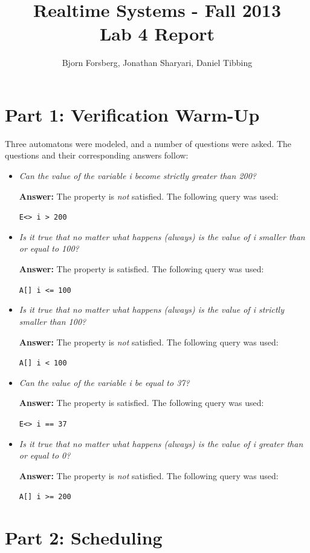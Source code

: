\documentclass[a4paper,10pt]{article}
\title{Realtime Systems - Fall 2013 \\ \textbf{Lab 4 Report}}
\author{Bjorn Forsberg, Jonathan Sharyari, Daniel Tibbing}
\newcommand{\answer}{\textbf{Answer: }}
\newcommand{\query}[1]{\lstinline{#1}}
\begin{document}
\maketitle

\section*{Part 1: Verification Warm-Up}

Three automatons were modeled, and a number of questions were asked. The questions and their corresponding answers follow:

\begin{itemize}
  \item \emph{Can the value of the variable i become strictly greater than 200?}
    
    \answer The property is \emph{not} satisfied. The following query was used: 

    \query{E<> i > 200}
  \item \emph{Is it true that no matter what happens (always) is the value of i smaller than or equal to 100?}
    
    \answer The property is satisfied. The following query was used:

    \query{A[] i <= 100}
  \item \emph{Is it true that no matter what happens (always) is the value of i strictly smaller than 100?}
    
    \answer The property is \emph{not} satisfied. The following query was used:

    \query{A[] i < 100}
  \item \emph{Can the value of the variable i be equal to 37?}
    
    \answer The property is satisfied. The following query was used:

    \query{E<> i == 37}
  \item \emph{Is it true that no matter what happens (always) is the value of i greater than or equal to 0?}
    
    \answer The property is \emph{not} satisfied. The following query was used:

    \query{A[] i >= 200}
\end{itemize}

\section*{Part 2: Scheduling}
\end{document}
